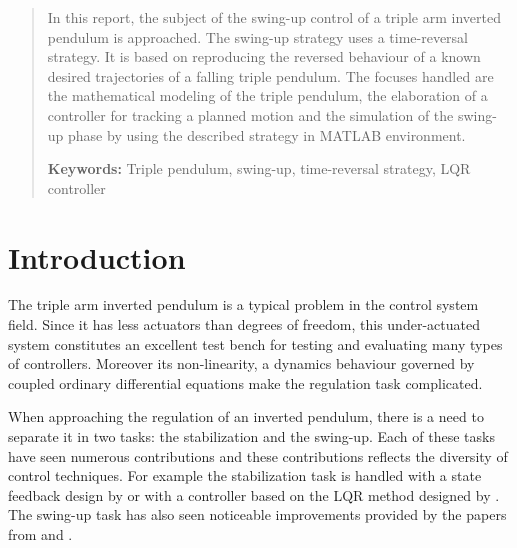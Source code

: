 \documentclass[a4paper,12pt]{article}
\begin{document}
\renewcommand{\headheight}{14.5pt}
\renewcommand{\tablename}{Table}
\renewcommand{\figurename}{Figure}

\hypersetup{pageanchor=false}

% 
\hypersetup{pageanchor=true}
\newpage


\begin{abstract}
In this report, the subject of the swing-up control of a triple arm inverted pendulum is approached. The swing-up strategy uses a time-reversal strategy. It is based on reproducing the reversed behaviour of a known desired trajectories of a falling triple pendulum. The focuses handled are the mathematical modeling of the triple pendulum, the elaboration of a controller for tracking a planned motion and the simulation of the swing-up phase by using the described strategy in MATLAB environment.

\noindent
\textbf{Keywords: }Triple pendulum, swing-up, time-reversal strategy, LQR controller
\end{abstract}
\newpage
\thispagestyle{empty}
\tableofcontents
\newpage




\section{Introduction}\label{sec:intro} %
The triple arm inverted pendulum is a typical problem in the control system field. Since it has less actuators than degrees of freedom, this under-actuated system constitutes an excellent test bench for testing and evaluating many types of controllers. Moreover its non-linearity, a dynamics behaviour governed by coupled ordinary differential equations make the regulation task complicated.

When approaching the regulation of an inverted pendulum, there is a need to separate it in two tasks: the stabilization and the swing-up. Each of these tasks have seen numerous contributions and these contributions reflects the diversity of control techniques. For example the stabilization task is handled with a state feedback design by \citet{Medrano1997} or with a controller based on the LQR method designed by \citet{Gupta2014}. The swing-up task has also seen noticeable improvements provided by the papers from \citet{Astrom2000287} and \citet{Gluck2013801}.
\end{document}
